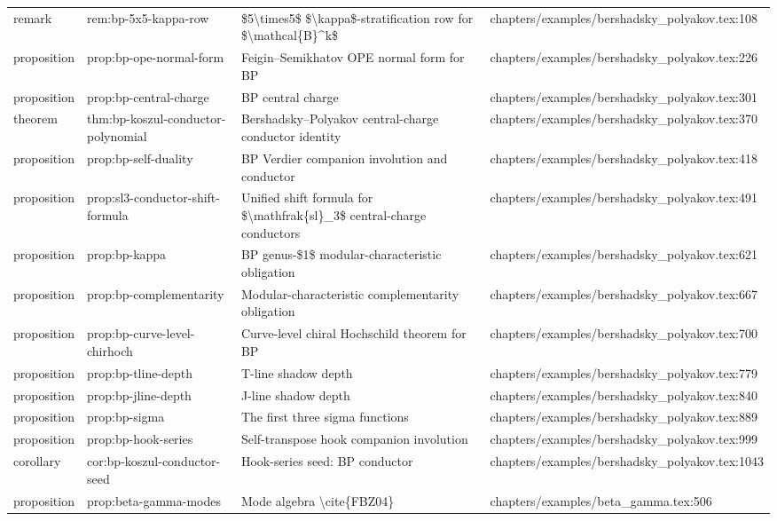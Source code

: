 \documentclass[11pt]{article}
\begin{document}
\begin{longtable}{L{0.10\textwidth}L{0.26\textwidth}L{0.42\textwidth}L{0.22\textwidth}}
remark & rem:bp-5x5-kappa-row & \$5\textbackslash{}times5\$ \$\textbackslash{}kappa\$-stratification row for \$\textbackslash{}mathcal\{B\}\textasciicircum{}k\$ & chapters/examples/bershadsky\_polyakov.tex:108\\
proposition & prop:bp-ope-normal-form & Feigin--Semikhatov OPE normal form for BP & chapters/examples/bershadsky\_polyakov.tex:226\\
proposition & prop:bp-central-charge & BP central charge & chapters/examples/bershadsky\_polyakov.tex:301\\
theorem & thm:bp-koszul-conductor-polynomial & Bershadsky--Polyakov central-charge conductor identity & chapters/examples/bershadsky\_polyakov.tex:370\\
proposition & prop:bp-self-duality & BP Verdier companion involution and conductor & chapters/examples/bershadsky\_polyakov.tex:418\\
proposition & prop:sl3-conductor-shift-formula & Unified shift formula for \$\textbackslash{}mathfrak\{sl\}\_3\$ central-charge conductors & chapters/examples/bershadsky\_polyakov.tex:491\\
proposition & prop:bp-kappa & BP genus-\$1\$ modular-characteristic obligation & chapters/examples/bershadsky\_polyakov.tex:621\\
proposition & prop:bp-complementarity & Modular-characteristic complementarity obligation & chapters/examples/bershadsky\_polyakov.tex:667\\
proposition & prop:bp-curve-level-chirhoch & Curve-level chiral Hochschild theorem for BP & chapters/examples/bershadsky\_polyakov.tex:700\\
proposition & prop:bp-tline-depth & T-line shadow depth & chapters/examples/bershadsky\_polyakov.tex:779\\
proposition & prop:bp-jline-depth & J-line shadow depth & chapters/examples/bershadsky\_polyakov.tex:840\\
proposition & prop:bp-sigma & The first three sigma functions & chapters/examples/bershadsky\_polyakov.tex:889\\
proposition & prop:bp-hook-series & Self-transpose hook companion involution & chapters/examples/bershadsky\_polyakov.tex:999\\
corollary & cor:bp-koszul-conductor-seed & Hook-series seed: BP conductor & chapters/examples/bershadsky\_polyakov.tex:1043\\
proposition & prop:beta-gamma-modes & Mode algebra \textbackslash{}cite\{FBZ04\} & chapters/examples/beta\_gamma.tex:506\\

\end{longtable}
\end{document}
